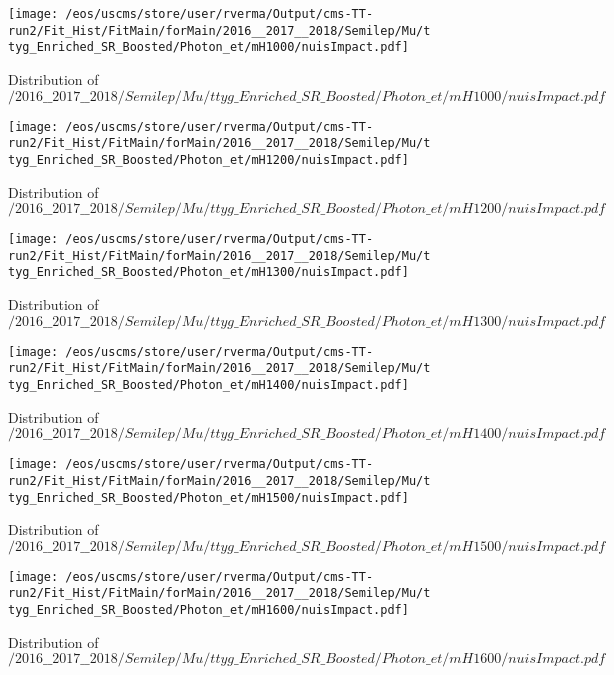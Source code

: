 \begin{figure}
\centering
\texttt{[image: /eos/uscms/store/user/rverma/Output/cms-TT-run2/Fit\_Hist/FitMain/forMain/2016\_\_2017\_\_2018/Semilep/Mu/ttyg\_Enriched\_SR\_Boosted/Photon\_et/mH1000/nuisImpact.pdf]}
\caption{Distribution of $/2016\_\_2017\_\_2018/Semilep/Mu/ttyg\_Enriched\_SR\_Boosted/Photon\_et/mH1000/nuisImpact.pdf$}
\end{figure}

\begin{figure}
\centering
\texttt{[image: /eos/uscms/store/user/rverma/Output/cms-TT-run2/Fit\_Hist/FitMain/forMain/2016\_\_2017\_\_2018/Semilep/Mu/ttyg\_Enriched\_SR\_Boosted/Photon\_et/mH1200/nuisImpact.pdf]}
\caption{Distribution of $/2016\_\_2017\_\_2018/Semilep/Mu/ttyg\_Enriched\_SR\_Boosted/Photon\_et/mH1200/nuisImpact.pdf$}
\end{figure}

\begin{figure}
\centering
\texttt{[image: /eos/uscms/store/user/rverma/Output/cms-TT-run2/Fit\_Hist/FitMain/forMain/2016\_\_2017\_\_2018/Semilep/Mu/ttyg\_Enriched\_SR\_Boosted/Photon\_et/mH1300/nuisImpact.pdf]}
\caption{Distribution of $/2016\_\_2017\_\_2018/Semilep/Mu/ttyg\_Enriched\_SR\_Boosted/Photon\_et/mH1300/nuisImpact.pdf$}
\end{figure}

\begin{figure}
\centering
\texttt{[image: /eos/uscms/store/user/rverma/Output/cms-TT-run2/Fit\_Hist/FitMain/forMain/2016\_\_2017\_\_2018/Semilep/Mu/ttyg\_Enriched\_SR\_Boosted/Photon\_et/mH1400/nuisImpact.pdf]}
\caption{Distribution of $/2016\_\_2017\_\_2018/Semilep/Mu/ttyg\_Enriched\_SR\_Boosted/Photon\_et/mH1400/nuisImpact.pdf$}
\end{figure}

\begin{figure}
\centering
\texttt{[image: /eos/uscms/store/user/rverma/Output/cms-TT-run2/Fit\_Hist/FitMain/forMain/2016\_\_2017\_\_2018/Semilep/Mu/ttyg\_Enriched\_SR\_Boosted/Photon\_et/mH1500/nuisImpact.pdf]}
\caption{Distribution of $/2016\_\_2017\_\_2018/Semilep/Mu/ttyg\_Enriched\_SR\_Boosted/Photon\_et/mH1500/nuisImpact.pdf$}
\end{figure}

\begin{figure}
\centering
\texttt{[image: /eos/uscms/store/user/rverma/Output/cms-TT-run2/Fit\_Hist/FitMain/forMain/2016\_\_2017\_\_2018/Semilep/Mu/ttyg\_Enriched\_SR\_Boosted/Photon\_et/mH1600/nuisImpact.pdf]}
\caption{Distribution of $/2016\_\_2017\_\_2018/Semilep/Mu/ttyg\_Enriched\_SR\_Boosted/Photon\_et/mH1600/nuisImpact.pdf$}
\end{figure}

